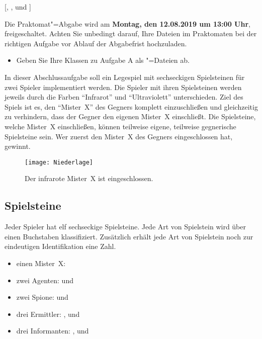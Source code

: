 \documentclass[ngerman, gray]{sdqassignment}
\begin{document}
[, ,  und ]


Die Praktomat"=Abgabe wird am \textbf{Montag, den 12.08.2019 um 13:00 Uhr}, freigeschaltet. Achten Sie unbedingt darauf, Ihre Dateien im Praktomaten bei der richtigen Aufgabe vor Ablauf der Abgabefrist hochzuladen.
\begin{itemize}
    \item Geben Sie Ihre Klassen zu Aufgabe A als "=Dateien ab.
\end{itemize}

\setcounter{figure}{0}
In dieser Abschlussaufgabe soll ein Legespiel mit sechseckigen Spielsteinen für zwei Spieler implementiert werden.
Die Spieler mit ihren Spielsteinen werden jeweils durch die Farben \enquote{Infrarot} und \enquote{Ultraviolett} unterschieden. Ziel des Spiels ist es, den \enquote{Mister~X} des Gegners komplett einzuschließen und gleichzeitig zu verhindern, dass der Gegner den eigenen Mister~X einschließt. Die Spielsteine, welche Mister~X einschließen, können teilweise eigene, teilweise gegnerische Spielsteine sein. Wer zuerst den Mister~X des Gegners eingeschlossen hat, gewinnt.

\begin{figure}[ht]
    \centering
    \texttt{[image: Niederlage]}
    \label{fig:niederlage}
    \caption{Der infrarote Mister~X ist eingeschlossen.}
\end{figure}

\subsection{Spielsteine}
\label{steine}
Jeder Spieler hat elf sechseckige Spielsteine. Jede Art von Spielstein wird über einen Buchstaben klassifiziert. Zusätzlich erhält jede Art von Spielstein noch zur eindeutigen Identifikation eine Zahl.
\begin{itemize}
    \item einen Mister~X: 
    \item zwei Agenten:  und 
    \item zwei Spione:  und 
    \item drei Ermittler: ,  und 
    \item drei Informanten: ,  und 
\end{itemize}
\end{document}
